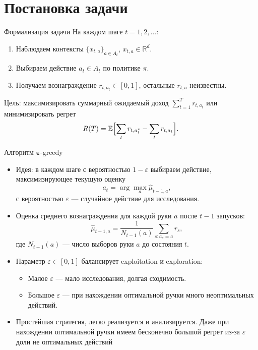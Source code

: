 \documentclass[10pt]{beamer}
\begin{document}
\section{Постановка задачи}
\begin{frame}{Формализация задачи}
  На каждом шаге $t=1,2,\dots$:
  \begin{enumerate}
    \item Наблюдаем контексты $\{x_{t,a}\}_{a\in A_t}$, $x_{t,a}\in\mathbb{R}^d$.
    \item Выбираем действие $a_t\in A_t$ по политике $\pi$.
    \item Получаем вознаграждение $r_{t,a_t}\in[0,1]$, остальные $r_{t,a}$ неизвестны.
  \end{enumerate}
  Цель: максимизировать суммарный ожидаемый доход $\displaystyle \sum_{t=1}^T r_{t,a_t}$ или минимизировать регрет
  \[ R(T)=\mathbb{E}\Bigl[\sum_t r_{t,a^*_t}-\sum_t r_{t,a_t}\Bigr]. \]
\end{frame}
\begin{frame}{Алгоритм $\boldsymbol{\varepsilon}$-greedy}
  \begin{itemize}
    \item Идея: в каждом шаге с вероятностью $1-\varepsilon$ выбираем действие, максимизирующее текущую оценку
    $$a_t = \arg\max_a \hat{\mu}_{t-1,a},$$
    с вероятностью $\varepsilon$ — случайное действие для исследования.
    \item Оценка среднего вознаграждения для каждой руки $a$ после $t-1$ запусков:
    $$\hat{\mu}_{t-1,a} = \frac{1}{N_{t-1}(a)} \sum_{s: a_s = a} r_s,$$
    где $N_{t-1}(a)$ — число выборов руки $a$ до состояния $t$.
    \item Параметр $\varepsilon\in[0,1]$ балансирует exploitation и exploration:
    \begin{itemize}
      \item Малое $\varepsilon$ — мало исследования, долгая сходимость.
      \item Большое $\varepsilon$ — при нахождении оптимальной ручки много неоптимальных действий.
    \end{itemize}
    \item Простейшая стратегия, легко реализуется и анализируется. Даже при нахождении оптимальной ручки имеем бесконечно большой регрет из-за $\varepsilon$ доли не оптимальных действий
  \end{itemize}
\end{frame}
\end{document}
